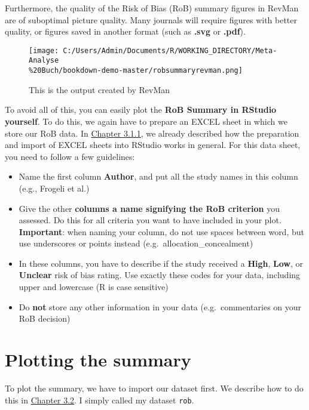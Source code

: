 \documentclass[]{book}
\providecommand{\tightlist}{%
  \setlength{\itemsep}{0pt}\setlength{\parskip}{0pt}}
\theoremstyle{definition}
\theoremstyle{definition}
\theoremstyle{definition}
\theoremstyle{remark}
\begin{document}
Furthermore, the quality of the Risk of Bias (RoB) summary figures in
RevMan are of suboptimal picture quality. Many journals will require
figures with better quality, or figures saved in another format (such as
\textbf{.svg} or \textbf{.pdf}).

\begin{figure}
\centering
\texttt{[image: C:/Users/Admin/Documents/R/WORKING\_DIRECTORY/Meta-Analyse\\\%20Buch/bookdown-demo-master/robsummaryrevman.png]}
\caption{This is the output created by RevMan}
\end{figure}

To avoid all of this, you can easily plot the \textbf{RoB Summary in
RStudio yourself}. To do this, we again have to prepare an EXCEL sheet
in which we store our RoB data. In
\protect\hyperlink{excel_preparation}{Chapter 3.1.1}, we already
described how the preparation and import of EXCEL sheets into RStudio
works in general. For this data sheet, you need to follow a few
guidelines:

\begin{itemize}
\tightlist
\item
  Name the first column \textbf{Author}, and put all the study names in
  this column (e.g., Frogeli et al.)
\item
  Give the other \textbf{columns a name signifying the RoB criterion}
  you assessed. Do this for all criteria you want to have included in
  your plot. \textbf{Important}: when naming your column, do not use
  spaces between word, but use underscores or points instead
  (e.g.~allocation\_concealment)
\item
  In these columns, you have to describe if the study received a
  \textbf{High}, \textbf{Low}, or \textbf{Unclear} risk of bias rating.
  Use exactly these codes for your data, including upper and lowercase
  (R is case sensitive)
\item
  Do \textbf{not} store any other information in your data
  (e.g.~commentaries on your RoB decision)
\end{itemize}

\section{Plotting the summary}\label{plotting-the-summary}

To plot the summary, we have to import our dataset first. We describe
how to do this in \protect\hyperlink{import_excel}{Chapter 3.2}. I
simply called my dataset \texttt{rob}.
\end{document}
